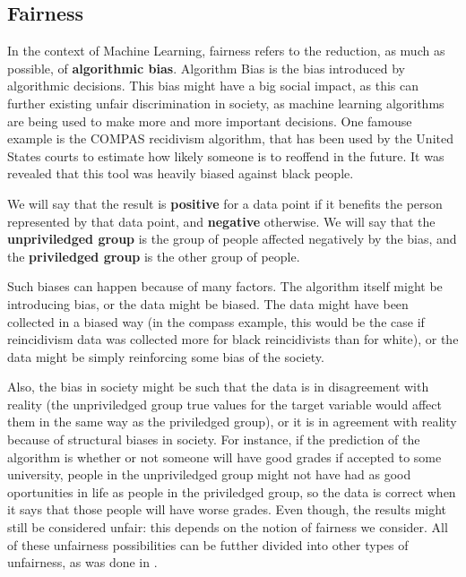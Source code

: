 \subsection{Fairness}

In the context of Machine Learning, fairness refers to the reduction, as much as possible, of \textbf{algorithmic bias}. Algorithm Bias is the bias introduced by algorithmic decisions. This bias might have a big social impact, as this can further existing unfair discrimination in society, as machine learning algorithms are being used to make more and more important decisions. One famouse example is the COMPAS recidivism algorithm, that has been used by the United States courts to estimate how likely someone is to reoffend in the future. It was revealed \cite{Compass} that this tool was heavily biased against black people. 

We will say that the result is \textbf{positive} for a data point if it benefits the person represented by that data point, and \textbf{negative} otherwise. We will say that the \textbf{unpriviledged group} is the group of people affected negatively by the bias, and the \textbf{priviledged group} is the other group of people.

Such biases can happen because of many factors. The algorithm itself might be introducing bias, or the data might be biased. The data might have been collected in a biased way (in the compass example, this would be the case if reincidivism data was collected more for black reincidivists than for white), or the data might be simply reinforcing some bias of the society. 

Also, the bias in society might be such that the data is in disagreement with reality (the unpriviledged group true values for the target variable would affect them in the same way as the priviledged group), or it is in agreement with reality because of structural biases in society. For instance, if the prediction of the algorithm is whether or not someone will have good grades if accepted to some university, people in the unpriviledged group might not have had as good oportunities in life as people in the priviledged group, so the data is correct when it says that those people will have worse grades. Even though, the results might still be considered unfair: this depends on the notion of fairness we consider. All of these unfairness possibilities can be futther divided into other types of unfairness, as was done in \cite{A Survey on Bias and Fairness in Machine Learning}.

